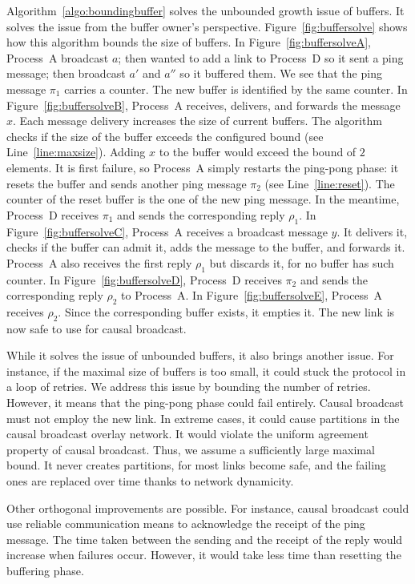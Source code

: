 Algorithm~\ref{algo:boundingbuffer} solves the unbounded growth issue of
buffers. It solves the issue from the buffer owner's
perspective. Figure~\ref{fig:buffersolve} shows how this algorithm bounds the
size of buffers. In Figure~\ref{fig:buffersolveA}, Process~A broadcast $a$; then
wanted to add a link to Process~D so it sent a ping message; then broadcast $a'$
and $a''$ so it buffered them. We see that the ping message $\pi_1$ carries a
counter. The new buffer is identified by the same counter. In
Figure~\ref{fig:buffersolveB}, Process~A receives, delivers, and forwards the
message $x$. Each message delivery increases the size of current buffers. The
algorithm checks if the size of the buffer exceeds the configured bound (see
Line~\ref{line:maxsize}). Adding $x$ to the buffer would exceed the bound of
$2$ elements. It is first failure, so Process~A simply restarts the ping-pong
phase: it resets the buffer and sends another ping message $\pi_2$ (see
Line~\ref{line:reset}). The counter of the reset buffer is the one of the new
ping message. In the meantime, Process~D receives $\pi_1$ and sends the
corresponding reply $\rho_1$. In Figure~\ref{fig:buffersolveC}, Process~A
receives a broadcast message $y$. It delivers it, checks if the buffer can admit
it, adds the message to the buffer, and forwards it. Process~A also receives the
first reply $\rho_1$ but discards it, for no buffer has such counter. In
Figure~\ref{fig:buffersolveD}, Process~D receives $\pi_2$ and sends the
corresponding reply $\rho_2$ to Process~A. In Figure~\ref{fig:buffersolveE},
Process~A receives $\rho_2$. Since the corresponding buffer exists, it empties
it. The new link is now safe to use for causal broadcast.

While it solves the issue of unbounded buffers, it also brings another
issue. For instance, if the maximal size of buffers is too small, it could stuck
the protocol in a loop of retries. We address this issue by bounding the number
of retries. However, it means that the ping-pong phase could fail
entirely. Causal broadcast must not employ the new link. In extreme cases, it
could cause partitions in the causal broadcast overlay network. It would violate
the uniform agreement property of causal broadcast. Thus, we assume a
sufficiently large maximal bound. It never creates partitions, for most links
become safe, and the failing ones are replaced over time thanks to
network dynamicity.

Other orthogonal improvements are possible. For instance, causal broadcast could
use reliable communication means to acknowledge the receipt of the ping
message. The time taken between the sending and the receipt of the
reply would increase when failures occur. However, it would take less
time than resetting the buffering phase.

